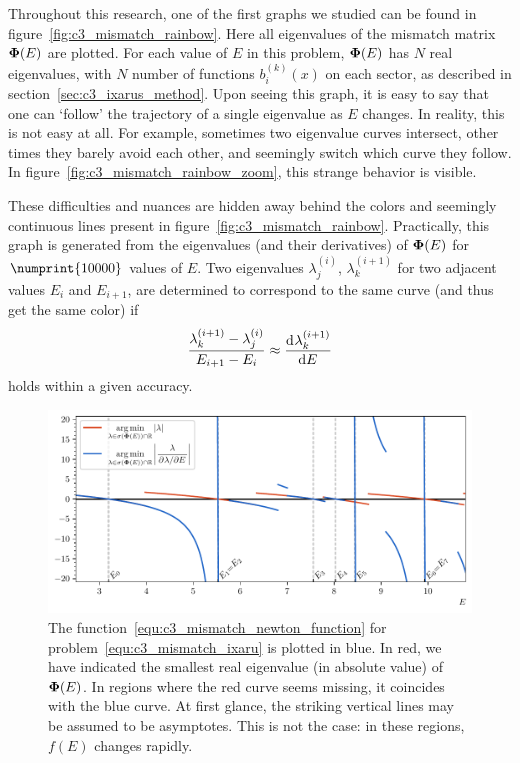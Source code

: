 Throughout this research, one of the first graphs we studied can be found in figure~\ref{fig:c3_mismatch_rainbow}. Here all eigenvalues of the mismatch matrix $\vb{\Phi}(E)$ are plotted. For each value of $E$ in this problem, $\vb{\Phi}(E)$ has $N$ real eigenvalues, with $N$ number of functions $b_i^{(k)}(x)$ on each sector, as described in section~\ref{sec:c3_ixarus_method}. Upon seeing this graph, it is easy to say that one can `follow' the trajectory of a single eigenvalue as $E$ changes. In reality, this is not easy at all. For example, sometimes two eigenvalue curves intersect, other times they barely avoid each other, and seemingly switch which curve they follow. In figure~\ref{fig:c3_mismatch_rainbow_zoom}, this strange behavior is visible.


These difficulties and nuances are hidden away behind the colors and seemingly continuous lines present in figure~\ref{fig:c3_mismatch_rainbow}. Practically, this graph is generated from the eigenvalues (and their derivatives) of $\vb{\Phi}(E)$ for $\numprint{10000}$ values of $E$. Two eigenvalues $\lambda^{(i)}_j$, $\lambda^{(i+1)}_k$  for two adjacent values $E_{i}$ and $E_{i+1}$, are determined to correspond to the same curve (and thus get the same color) if
$$ \frac{\lambda^{(i+1)}_k  - \lambda^{(i)}_j}{E_{i+1} - E_i} \approx \dv[]{\lambda^{(i+1)}_k}{E} $$
holds within a given accuracy.

\begin{figure}
  \centering
  \includegraphics[width=\textwidth]{img/chapter3/mismatch_newton.pdf}
  \caption{The function~\eqref{equ:c3_mismatch_newton_function} for problem~\eqref{equ:c3_mismatch_ixaru} is plotted in blue. In red, we have indicated the smallest real eigenvalue (in absolute value) of $\vb{\Phi}(E)$. In regions where the red curve seems missing, it coincides with the blue curve. At first glance, the striking vertical lines may be assumed to be asymptotes. This is not the case: in these regions, $f(E)$ changes rapidly.}\label{fig:c3_mismatch_newton}
\end{figure}

